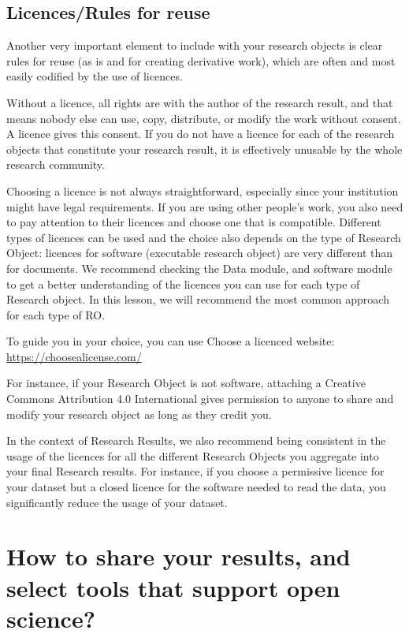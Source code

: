 \documentclass[
  letterpaper,
  DIV=11,
  numbers=noendperiod]{scrreport}
\begin{document}
\hypertarget{licencesrules-for-reuse}{%
\subsection{Licences/Rules for reuse}\label{licencesrules-for-reuse}}

Another very important element to include with your research objects is
clear rules for reuse (as is and for creating derivative work), which
are often and most easily codified by the use of licences.

Without a licence, all rights are with the author of the research
result, and that means nobody else can use, copy, distribute, or modify
the work without consent. A licence gives this consent. If you do not
have a licence for each of the research objects that constitute your
research result, it is effectively unusable by the whole research
community.

Choosing a licence is not always straightforward, especially since your
institution might have legal requirements. If you are using other
people's work, you also need to pay attention to their licences and
choose one that is compatible. Different types of licences can be used
and the choice also depends on the type of Research Object: licences for
software (executable research object) are very different than for
documents. We recommend checking the Data module, and software module to
get a better understanding of the licences you can use for each type of
Research object. In this lesson, we will recommend the most common
approach for each type of RO.

To guide you in your choice, you can use Choose a licenced website:
\url{https://choosealicense.com/}

For instance, if your Research Object is not software, attaching a
Creative Commons Attribution 4.0 International gives permission to
anyone to share and modify your research object as long as they credit
you.

In the context of Research Results, we also recommend being consistent
in the usage of the licences for all the different Research Objects you
aggregate into your final Research results. For instance, if you choose
a permissive licence for your dataset but a closed licence for the
software needed to read the data, you significantly reduce the usage of
your dataset.

\hypertarget{how-to-share-your-results-and-select-tools-that-support-open-science}{%
\section{How to share your results, and select tools that support open
science?}\label{how-to-share-your-results-and-select-tools-that-support-open-science}}
\end{document}
